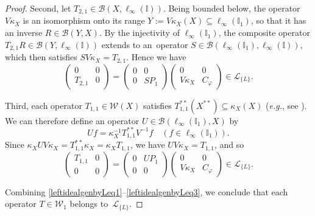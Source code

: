 \documentclass[12pt]{amsart}
\theoremstyle{definition}
\numberwithin{equation}{section}
\begin{document}
\begin{proof}
  Second, let $T_{2,1}\in\mathscr{B}(X,\ell_\infty(\mathbb{I}))$.  Being
  bounded below, the operator $V\kappa_X$ is an isomorphism onto its
  range $Y := V\kappa_X(X)\subseteq\ell_\infty(\mathbb{I}_1)$, so that
  it has an inverse $R\in\mathscr{B}(Y,X)$. By the injectivity of
  $\ell_\infty(\mathbb{I}_1)$, the composite operator
  $T_{2,1}R\in\mathscr{B}(Y,\ell_\infty(\mathbb{I}))$ extends to
  an~opera\-tor
  $S\in\mathscr{B}(\ell_\infty(\mathbb{I}_1),\ell_\infty(\mathbb{I}))$,
  which then satisfies $SV\kappa_X = T_{2,1}$. Hence we have
  \begin{equation}\label{leftidealgenbyLeq2}
    \begin{pmatrix} 0 & 0\\ T_{2,1} & 0\end{pmatrix} =  
    \begin{pmatrix} 0 & 0\\ 0 &
      SP_1 \end{pmatrix}\begin{pmatrix} 0 & 0\\ V\kappa_X &
      C_{\ensuremath{\varphi}} \end{pmatrix}\in\mathscr{L}_{\{L\}}. \end{equation}  

  Third, each operator $T_{1,1}\in\mathscr{W}(X)$ satisfies
  $T_{1,1}^{**}(X^{**})\subseteq\kappa_X(X)$ (\emph{e.g.}, see
  \cite[Theo\-rem~3.5.8]{meg}). We can therefore define an operator
  $U\in\mathscr{B}(\ell_\infty(\mathbb{I}_1),X)$ by \[ Uf =
  \kappa_X^{-1}T_{1,1}^{**}V^{-1}f\quad
  (f\in\ell_\infty(\mathbb{I}_1)). \] Since $\kappa_X U V\kappa_X =
  T_{1,1}^{**}\kappa_X = \kappa_X T_{1,1}$, we have $UV\kappa_X=
  T_{1,1}$, and so
 \begin{equation}\label{leftidealgenbyLeq3} 
 \begin{pmatrix} T_{1,1} & 0\\ 0 & 0\end{pmatrix} =  
 \begin{pmatrix} 0 & UP_1\\ 0 &
   0 \end{pmatrix} \begin{pmatrix} 0 & 0\\ V\kappa_X &
   C_{\ensuremath{\varphi}} \end{pmatrix}\in\mathscr{L}_{\{L\}}. \end{equation}  

Combining \eqref{leftidealgenbyLeq1}--\eqref{leftidealgenbyLeq3}, we
conclude that each operator $T\in\mathscr{W}_1$ belongs
to~$\mathscr{L}_{\{L\}}$.
\end{proof}
\end{document}

